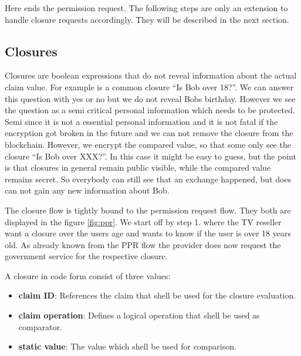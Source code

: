 Here ends the permission request. The following steps are only an extension to handle closure requests accordingly. They will be described in the next section.     

\subsection{Closures}
\label{sec:closure}
Closures are boolean expressions that do not reveal information about the actual claim value. For example is a common closure “Is Bob over 18?”. We can answer this question with yes or no but we do not reveal Bobs birthday. However we see the question as a semi critical personal information which needs to be protected. Semi since it is not a essential personal information and it is not fatal if the encryption got broken in the future and we can not remove the closure from the blockchain. However, we encrypt the compared value, so that some only see the closure “Is Bob over XXX?”. In this case it might be easy to guess, but the point is that closures in general remain public visible, while the compared value remains secret. So everybody can still see that an exchange happened, but does can not gain any new information about Bob. 

The closure flow is tightly bound to the permission request flow. They both are displayed in the figure \ref{fig:ppr}.  We start off by step 1. where the TV reseller want a closure over the users age and wants to know if the user is over 18 years old. As already known from the PPR flow the provider does now request the government service for the respective closure. 

A closure in code form consist of three values: 

\begin{itemize}
\item \textbf{claim ID}: References the claim that shell be used for the closure evaluation. 
\item \textbf{claim operation}: Defines a logical operation that shell be used as comparator. 
\item \textbf{static value}: The value which shell be used for comparison. 
\end{itemize}

